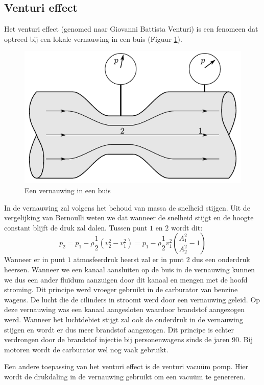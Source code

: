 		\subsection{Venturi effect}
Het venturi effect (genomed naar Giovanni Battista Venturi) is een fenomeen dat optreed bij een lokale vernauwing in een buis (Figuur \ref{fig:venturi}).
\begin{figure}[htb]
	\centering
	\includegraphics{fig/deeltjesvergelijkingen/Venturi}
	\caption{Een vernauwing in een buis}
	\label{fig:venturi}
\end{figure}
In de vernauwing zal volgens het behoud van massa de snelheid stijgen. Uit de vergelijking van Bernoulli weten we dat wanneer de snelheid stijgt en de hoogte constant blijft de druk zal dalen. Tussen punt $1$ en $2$ wordt dit:
\begin{equation}
	p_2 = p_1 - \rho \frac{1}{2}\left(v_2^2-v_1^2\right) = p_1 - \rho \frac{1}{2} v_1^2 \left(\frac{A_1^2}{A_2^2}-1\right)
\end{equation}
Wanneer er in punt $1$ atmosfeerdruk heerst zal er in punt $2$ dus een onderdruk heersen. Wanneer we een kanaal aansluiten op de buis in de vernauwing kunnen we dus een ander fluïdum aanzuigen door dit kanaal en mengen met de hoofd stroming. Dit principe werd vroeger gebruikt in de carburator van benzine wagens. De lucht die de cilinders in stroomt werd door een vernauwing geleid. Op deze vernauwing was een kanaal aangesloten waardoor brandstof aangezogen werd. Wanneer het luchtdebiet stijgt zal ook de onderdruk in de vernauwing stijgen en wordt er dus meer brandstof aangezogen. Dit principe is echter verdrongen door de brandstof injectie bij personenwagens sinds de jaren 90. Bij motoren wordt de carburator wel nog vaak gebruikt.

Een andere toepassing van het venturi effect is de venturi vacuüm pomp. Hier wordt de drukdaling in de vernauwing gebruikt om een vacuüm te genereren. 

